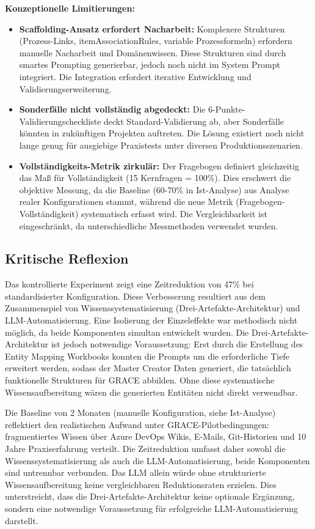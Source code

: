 \textbf{Konzeptionelle Limitierungen:}

\begin{itemize}
    \item \textbf{Scaffolding-Ansatz erfordert Nacharbeit:} Komplexere Strukturen (Prozess-Links, itemAssociationRules, variable Prozessformeln) erfordern manuelle Nacharbeit und Domänenwissen. Diese Strukturen sind durch smartes Prompting generierbar, jedoch noch nicht im System Prompt integriert. Die Integration erfordert iterative Entwicklung und Validierungserweiterung.

    \item \textbf{Sonderfälle nicht vollständig abgedeckt:} Die 6-Punkte-Validierungscheckliste deckt Standard-Validierung ab, aber Sonderfälle könnten in zukünftigen Projekten auftreten. Die Lösung existiert noch nicht lange genug für ausgiebige Praxistests unter diversen Produktionsszenarien.

    \item \textbf{Vollständigkeits-Metrik zirkulär:} Der Fragebogen definiert gleichzeitig das Maß für Vollständigkeit (15 Kernfragen = 100\%). Dies erschwert die objektive Messung, da die Baseline (60-70\% in Ist-Analyse) aus Analyse realer Konfigurationen stammt, während die neue Metrik (Fragebogen-Vollständigkeit) systematisch erfasst wird. Die Vergleichbarkeit ist eingeschränkt, da unterschiedliche Messmethoden verwendet wurden.
\end{itemize}


\subsection{Kritische Reflexion}
\label{subsec:KritischeReflexion}

Das kontrollierte Experiment zeigt eine Zeitreduktion von 47\% bei standardisierter Konfiguration. Diese Verbesserung resultiert aus dem Zusammenspiel von Wissenssystematisierung (Drei-Artefakte-Architektur) und LLM-Automatisierung. Eine Isolierung der Einzeleffekte war methodisch nicht möglich, da beide Komponenten simultan entwickelt wurden. Die Drei-Artefakte-Architektur ist jedoch notwendige Voraussetzung: Erst durch die Erstellung des Entity Mapping Workbooks konnten die Prompts um die erforderliche Tiefe erweitert werden, sodass der Master Creator Daten generiert, die tatsächlich funktionelle Strukturen für GRACE abbilden. Ohne diese systematische Wissensaufbereitung wären die generierten Entitäten nicht direkt verwendbar.

\noindent Die Baseline von 2 Monaten (manuelle Konfiguration, siehe Ist-Analyse) reflektiert den realistischen Aufwand unter GRACE-Pilotbedingungen: fragmentiertes Wissen über Azure DevOps Wikis, E-Mails, Git-Historien und 10 Jahre Praxiserfahrung verteilt. Die Zeitreduktion umfasst daher sowohl die Wissenssystematisierung als auch die LLM-Automatisierung, beide Komponenten sind untrennbar verbunden. Das LLM allein würde ohne strukturierte Wissensaufbereitung keine vergleichbaren Reduktionsraten erzielen. Dies unterstreicht, dass die Drei-Artefakte-Architektur keine optionale Ergänzung, sondern eine notwendige Voraussetzung für erfolgreiche LLM-Automatisierung darstellt.



